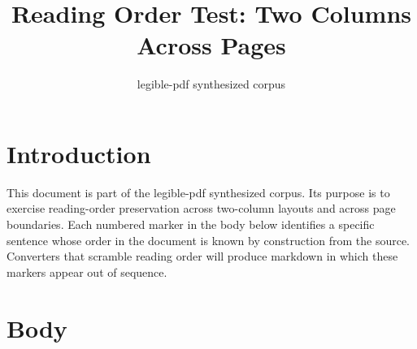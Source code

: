 \documentclass[12pt]{article}
\title{Reading Order Test: Two Columns Across Pages}
\author{legible-pdf synthesized corpus}
\date{}
\begin{document}
\maketitle

\section{Introduction}

This document is part of the legible-pdf synthesized corpus. Its purpose is
to exercise reading-order preservation across two-column layouts and across
page boundaries. Each numbered marker in the body below identifies a
specific sentence whose order in the document is known by construction from
the source. Converters that scramble reading order will produce markdown in
which these markers appear out of sequence.

\section{Body}
\end{document}
